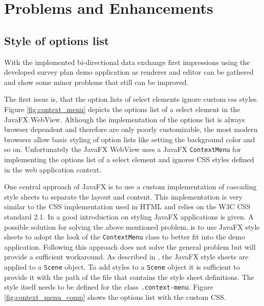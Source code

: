 \section{Problems and Enhancements}

\subsection{Style of options list}

With the implemented bi-directional data exchange first impressions using the developed survey plan demo application as renderer and editor can be gathered and show some minor problems that still can be improved.

The first issue is, that the option lists of select elements ignore custom css styles. Figure \ref{fig:context_menu} depicts the options list of a select element in the JavaFX WebView. Although the implementation of the options list is always browser dependent and therefore are only poorly customizable, the most modern browsers allow basic styling of option lists like setting the background color and so on. Unfortunately the JavaFX WebView uses a JavaFX \texttt{ContextMenu} for implementing the options list of a select element and ignores CSS styles defined in the web application context. 

One central approach of JavaFX is to use a custom implementation of cascading style sheets to separate the layout and content. This implementation is very similar to the CSS implementation used in HTML and relies on the W3C CSS standard 2.1. In \autocite{impl:skinning-fx} a good introduction on styling JavaFX applications is given. A possible solution for solving the above mentioned problem, is to use JavaFX style sheets to adopt the look of the \texttt{ContextMenu} class to better fit into the demo application. Following this approach does not solve the general problem but will provide a sufficient workaround. As described in \autocite{impl:skinning-fx}, the JavaFX style sheets are applied to a \texttt{Scene} object. To add styles to a \texttt{Scene} object it is sufficient to provide it with the path of the file that contains the style sheet definitions. The style itself needs to be defined for the class \texttt{.context-menu}. Figure \ref{fig:context_menu_comp} shows the options list with the custom CSS.

